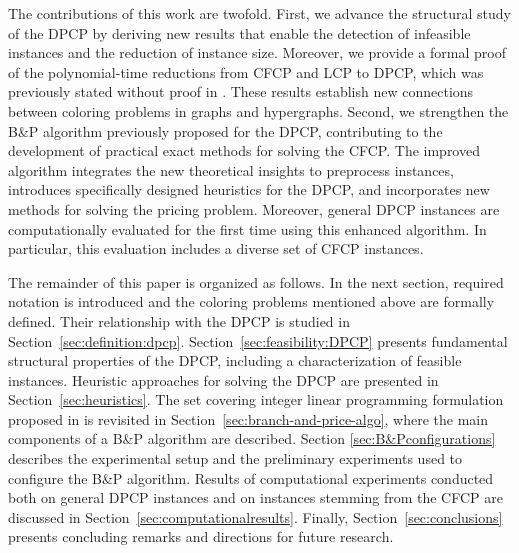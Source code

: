 \documentclass[preprint, 11pt, authoryear]{elsarticle}
\newcommand{\quitar}[1]{{\color{red} \sout{#1}}}
\begin{document}
The contributions of this work are twofold.
First, we advance the structural study of the DPCP by deriving new results that enable the detection of infeasible instances and the reduction of instance size.
Moreover, we provide a formal proof of the polynomial-time reductions from CFCP and LCP to DPCP, which was previously stated without proof in \cite{LucciEtAl2025}. 
These results establish new connections between coloring problems in graphs and hypergraphs.
Second, we strengthen the B\&P algorithm previously proposed for the DPCP, contributing to the development of practical exact methods for solving the CFCP.
The improved algorithm integrates the new theoretical insights to preprocess instances, introduces specifically designed heuristics for the DPCP, and incorporates new methods for solving the pricing problem.
Moreover, general DPCP instances are computationally evaluated for the first time using this enhanced algorithm.
In particular, this evaluation includes a diverse set of CFCP instances.


The remainder of this paper is organized as follows. In the next section, required notation is introduced and the coloring problems mentioned above are formally defined. Their relationship with the DPCP is studied in Section~\ref{sec:definition:dpcp}. Section~\ref{sec:feasibility:DPCP} presents fundamental structural properties of the DPCP, including a characterization of feasible instances.
Heuristic approaches for solving the DPCP are presented in Section~\ref{sec:heuristics}. The set covering integer linear programming formulation proposed in \cite{LucciEtAl2025} is revisited in Section~\ref{sec:branch-and-price-algo}, where the main components of a B\&P algorithm are described. 
Section \ref{sec:B&Pconfigurations} describes the experimental setup and the preliminary experiments used to configure the B\&P algorithm.
Results of computational experiments conducted both on general DPCP instances and on instances stemming from the CFCP are discussed in Section~\ref{sec:computationalresults}. Finally, Section~\ref{sec:conclusions} presents concluding remarks and directions for future research.
\end{document}

